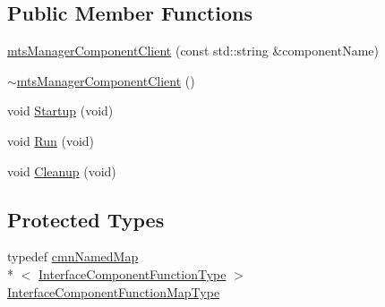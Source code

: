 \subsection*{Public Member Functions}
\begin{DoxyCompactItemize}
\item 
\hyperlink{classmts_manager_component_client_af587303a834c7dbe86cc024ba1354c98}{mts\-Manager\-Component\-Client} (const std\-::string \&component\-Name)
\item 
\hyperlink{classmts_manager_component_client_ad0e2d333466314a3aade1e76df5314ed}{$\sim$mts\-Manager\-Component\-Client} ()
\item 
void \hyperlink{classmts_manager_component_client_a24261b416cd8c9389842d6a29ddb4cc7}{Startup} (void)
\item 
void \hyperlink{classmts_manager_component_client_a9bd3a578609dfafe654f5646eb7a0c74}{Run} (void)
\item 
void \hyperlink{classmts_manager_component_client_aadabafb080cf1bce69eb0bdfc5192dac}{Cleanup} (void)
\end{DoxyCompactItemize}
\subsection*{Protected Types}
\begin{DoxyCompactItemize}
\item 
typedef \hyperlink{classcmn_named_map}{cmn\-Named\-Map}\\*
$<$ \hyperlink{structmts_manager_component_client_1_1_interface_component_function_type}{Interface\-Component\-Function\-Type} $>$ \hyperlink{classmts_manager_component_client_a6f0f9dde52834d02169c3b1feda1cab5}{Interface\-Component\-Function\-Map\-Type}
\end{DoxyCompactItemize}
